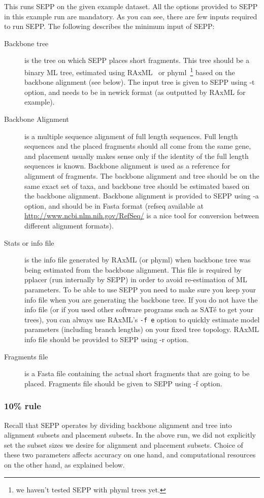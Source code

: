 \documentclass[11pt]{article} %
\newcommand{\sepp}{SEPP\xspace}
\newcommand{\ins}[1]{{\tt #1}}
\newcommand{\sate}{SAT\'{e}\xspace}
\newcommand{\raxml}{RAxML\xspace}
\begin{document}
This runs \sepp on the given example dataset. All the options provided to \sepp in this example run are mandatory. As you can see, there are few inputs required to run \sepp. The following describes the minimum input of \sepp:
\begin {description}
\item[Backbone tree] is the tree on which \sepp places short fragments. This tree should be a binary ML tree, estimated using \raxml~\cite{raxml} or phyml~\cite{phyml}\footnote{we haven't tested \sepp with phyml trees yet.} based on the backbone alignment (see below). The input tree is given to \sepp using -t option, and needs to be in newick format (as outputted by \raxml for example). 
\item[Backbone Alignment] is a multiple sequence alignment of full length sequences. Full length sequences and the placed fragments should all come from the same gene, and placement usually makes sense only if the identity of the full length sequences is known. Backbone alignment is used as a reference for alignment of fragments. The backbone alignment and tree should be on the same exact set of taxa, and backbone tree should be estimated based on the backbone alignment. Backbone alignment is provided to \sepp using -a option, and should be in Fasta format (refseq available  at \url{http://www.ncbi.nlm.nih.gov/RefSeq/} is a nice tool for conversion between different alignment formats). 
\item[Stats or info file] is the info file generated by RAxML (or phyml) when backbone tree was being estimated from the backbone alignment. This file is required by pplacer (run internally by \sepp) in order to avoid re-estimation of ML parameters. To be able to use \sepp you need to make sure you keep your info file when you are generating the backbone tree. If you do not have the info file (or if you used other software programs such as \sate to get your trees), you can always use RAxML's \ins{-f e} option to quickly estimate model parameters (including branch lengths) on your fixed tree topology. RAxML info file should be provided to \sepp using -r option. 
\item[Fragments file] is a Fasta file containing the actual short fragments that are going to be placed. Fragments file should be given to \sepp using -f option. 
\end{description}

\subsubsection{10\% rule}
Recall that \sepp operates by dividing backbone alignment and tree into alignment subsets and placement subsets. In the above run, we did not explicitly set the subset sizes we desire for alignment and placement subsets. Choice of these two parameters affects accuracy on one hand, and computational resources on the other hand, as explained below. 
\end{document}
